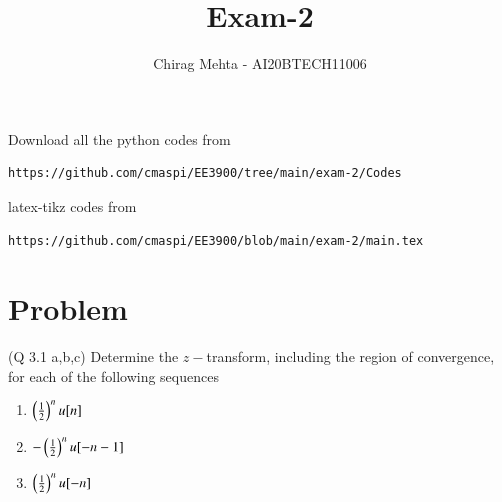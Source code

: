 \documentclass[journal,12pt,twocolumn]{IEEEtran}
\begin{document}
\makeatletter
{}
\makeatother
\let\StandardTheFigure\thefigure
\let\vec\mathbf
\renewcommand{\thefigure}{\theproblem}
\def\putbox#1#2#3{\makebox[0in][l]{\makebox[#1][l]{}\raisebox{\baselineskip}[0in][0in]{\raisebox{#2}[0in][0in]{#3}}}}
     \def\rightbox#1{\makebox[0in][r]{#1}}
     \def\centbox#1{\makebox[0in]{#1}}
     \def\topbox#1{\raisebox{-\baselineskip}[0in][0in]{#1}}
     \def\midbox#1{\raisebox{-0.5\baselineskip}[0in][0in]{#1}}
\vspace{3cm}
\title{Exam-2}
\author{Chirag Mehta - AI20BTECH11006}
\maketitle
\newpage
\bigskip
\renewcommand{\thefigure}{\theenumi}
\renewcommand{\thetable}{\theenumi}
Download all the python codes from
\begin{lstlisting}
https://github.com/cmaspi/EE3900/tree/main/exam-2/Codes
\end{lstlisting}
latex-tikz codes from 
\begin{lstlisting}
https://github.com/cmaspi/EE3900/blob/main/exam-2/main.tex
\end{lstlisting}
\section{Problem}
(Q 3.1 a,b,c) 
Determine the $z-$transform, including the region of convergence, for each of the following sequences
\begin{enumerate} [label= (\alph*)]
    \item $\left(\frac{1}{2}\right)^n u[n]$
    \item $-\left(\frac{1}{2}\right)^n u[-n-1]$
    \item $\left(\frac{1}{2}\right)^n u[-n]$
\end{enumerate}
\end{document}

